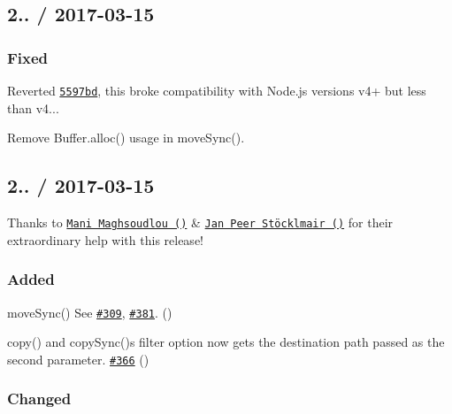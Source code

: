 \subsection*{2.. / 2017-\/03-\/15 }

\subsubsection*{Fixed}


\begin{DoxyItemize}
\item Reverted \href{https://github.com/jprichardson/node-fs-extra/commit/5597bd5b67f7d060f5f5bf26e9635be48330f5d7}{\tt {\ttfamily 5597bd}}, this broke compatibility with Node.\+js versions v4+ but less than {\ttfamily v4..}.
\item Remove {\ttfamily Buffer.\+alloc()} usage in {\ttfamily move\+Sync()}.
\end{DoxyItemize}

\subsection*{2.. / 2017-\/03-\/15 }

Thanks to \href{https://github.com/manidlou}{\tt Mani Maghsoudlou ()} \& \href{https://github.com/JPeer264}{\tt Jan Peer Stöcklmair ()} for their extraordinary help with this release!

\subsubsection*{Added}


\begin{DoxyItemize}
\item {\ttfamily move\+Sync()} See \href{https://github.com/jprichardson/node-fs-extra/issues/309}{\tt \#309}, \href{https://github.com/jprichardson/node-fs-extra/pull/381}{\tt \#381}. (\href{https://github.com/manidlou}{\tt })
\item {\ttfamily copy()} and {\ttfamily copy\+Sync()}\textquotesingle{}s {\ttfamily filter} option now gets the destination path passed as the second parameter. \href{https://github.com/jprichardson/node-fs-extra/pull/366}{\tt \#366} (\href{https://github.com/manidlou}{\tt })
\end{DoxyItemize}

\subsubsection*{Changed}


